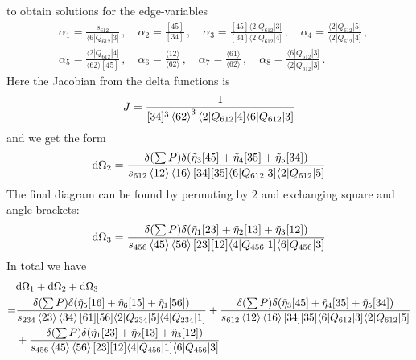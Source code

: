 \documentclass[letter,11pt]{article}
\newcommand{\ab}[1]{\langle #1 \rangle}
\newcommand{\aMs}[3]{\langle #1|#2|#3]}  		%
\newcommand{\sab}[1]{s_{#1}}
\begin{document}
to obtain solutions for the edge-variables
\begin{equation}
	\begin{aligned}
			& \alpha_1 = \frac{\sab{612}}{\aMs{6}{Q_{612}}{3}}\,, \quad \alpha_2 = \frac{[45]}{[34]}\,, \quad \alpha_3 = \frac{[45]\aMs{2}{Q_{612}}{3}}{[34]\aMs{2}{Q_{612}}{4}}\,, \quad \alpha_4 = \frac{\aMs{2}{Q_{612}}{5}}{\aMs{2}{Q_{612}}{4}}\,,\\ 
		&\alpha_5 = \frac{\aMs{2}{Q_{612}}{4}}{\ab{62}[45]}\,, 
		 \quad
		\alpha_6 = \frac{\ab{12}}{\ab{62}}\,,\quad \alpha_7 = \frac{\ab{61}}{\ab{62}}\,,\quad
		\alpha_8 =  \frac{\aMs{6}{Q_{612}}{3}}{\aMs{2}{Q_{612}}{3}}\,.
	\end{aligned}
\end{equation}
Here the Jacobian from the delta functions is
\begin{equation}
	\begin{aligned}
		J=\frac{1}{[34]^3\expval{62}^3\aMs{2}{Q_{612}}{4}\aMs{6}{Q_{612}}{3}}
	\end{aligned}
\end{equation}
and we get the form
\begin{equation}
	\begin{aligned}
		\dd \Omega_2=\frac{\delta(\sum P)\delta(\tilde\eta_3[45]+\tilde\eta_4[35]+\tilde\eta_5[34])}{s_{612}\expval{12}\expval{16}[34][35]\aMs{6}{Q_{612}}{3}\aMs{2}{Q_{612}}{5}}
	\end{aligned}
\end{equation}
The final diagram can be found by permuting by $2$ and exchanging square and angle brackets:
\begin{equation}
	\begin{aligned}
		\dd \Omega_3=\frac{\delta(\sum P)\delta(\tilde\eta_1[23]+\tilde\eta_2[13]+\tilde\eta_3[12])}{s_{456}\expval{45}\expval{56}[23][12]\aMs{4}{Q_{456}}{1}\aMs{6}{Q_{456}}{3}}
	\end{aligned}
\end{equation}
In total we have
\begin{equation}
	\begin{aligned}
		&\dd \Omega_1 +\dd \Omega_2+\dd \Omega_3\\
		=&\frac{\delta(\sum P)\delta(\tilde\eta_5[16]+\tilde\eta_6[15]+\tilde\eta_1[56])}{s_{234}\expval{23}\expval{34}[61][56]\aMs{2}{Q_{234}}{5}\aMs{4}{Q_{234}}{1}}
		+\frac{\delta(\sum P)\delta(\tilde\eta_3[45]+\tilde\eta_4[35]+\tilde\eta_5[34])}{s_{612}\expval{12}\expval{16}[34][35]\aMs{6}{Q_{612}}{3}\aMs{2}{Q_{612}}{5}}
		\\&+\frac{\delta(\sum P)\delta(\tilde\eta_1[23]+\tilde\eta_2[13]+\tilde\eta_3[12])}{s_{456}\expval{45}\expval{56}[23][12]\aMs{4}{Q_{456}}{1}\aMs{6}{Q_{456}}{3}}
	\end{aligned}
\end{equation}
\end{document}
